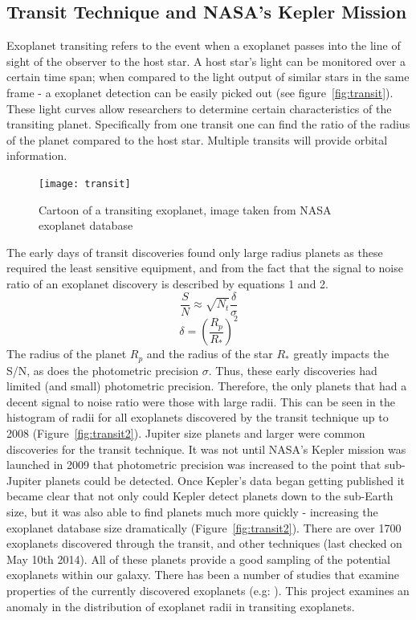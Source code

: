 \documentclass[
10pt, %
a4paper, %
oneside, %
headinclude,footinclude, %
BCOR5mm, %
]{scrartcl}
\begin{document}
\subsection{Transit Technique and NASA's Kepler Mission}
Exoplanet transiting refers to the event when a exoplanet passes into the line of sight of the observer to the host star. A host star's light can be monitored over a certain time span; when compared to the light output of similar stars in the same frame - a exoplanet detection can be easily picked out (see figure~\vref{fig:transit}). These light curves allow researchers to determine certain characteristics of the transiting planet. Specifically from one transit one can find the ratio of the radius of the planet compared to the host star. Multiple transits will provide orbital information\cite{TR1}.
\begin{figure}[tb]
\centering 
\texttt{[image: transit]} 
\caption[Transiting Exoplanet]{Cartoon of a transiting exoplanet, image taken from NASA exoplanet database}
\label{fig:transit} 
\end{figure}
The early days of transit discoveries found only large radius planets as these required the least sensitive equipment, and from the fact that the signal to noise ratio of an exoplanet discovery is described by equations 1 and 2. 
\begin{equation}
\frac{S}{N} \approx \sqrt{N_{t}}\frac{\delta}{\sigma}
\label{eq:t1}
\end{equation}
\begin{equation}
\delta = \left(\frac{R_{p}}{R_{*}}\right)^{2}
\label{eq:t2}
\end{equation}
The radius of the planet $R_{p}$ and the radius of the star $R_{*}$ greatly impacts the S/N, as does the photometric precision $\sigma$\cite{DST}. Thus, these early discoveries had limited (and small) photometric precision. Therefore, the only planets that had a decent signal to noise ratio were those with large radii. This can be seen in the histogram of radii for all exoplanets discovered by the transit technique up to 2008 (Figure~\vref{fig:transit2}). Jupiter size planets and larger were common discoveries for the transit technique. It was not until NASA's Kepler mission was launched in 2009\cite{kep2} that photometric precision was increased to the point that sub-Jupiter planets could be detected\cite{kep1}. Once Kepler's data began getting published it became clear that not only could Kepler detect planets down to the sub-Earth size, but it was also able to find planets much more quickly - increasing the exoplanet database size dramatically (Figure~\vref{fig:transit2}). There are over 1700 exoplanets discovered through the transit, and other techniques (last checked on May 10th 2014\cite{ExoData:nasa}). All of these planets provide a good sampling of the potential exoplanets within our galaxy. There has been a number of studies that examine properties of the currently discovered exoplanets (e.g: \cite{occ1,Marcey1,occ2}). This project examines an anomaly in the distribution of exoplanet radii in transiting exoplanets.
\end{document}
